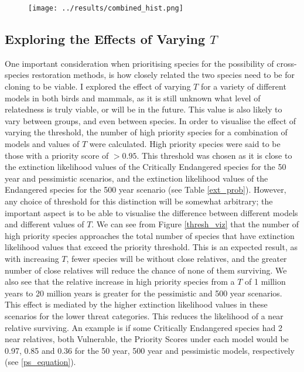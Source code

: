 \documentclass[10pt]{article}
\begin{document}
	\begin{figure}
		\texttt{[image: ../results/combined\_hist.png]}
		\caption{}\label{ps_hist}
	\end{figure}

	\subsection{Exploring the Effects of Varying $T$}
	One important consideration when prioritising species for the possibility of cross-species
	restoration methods, is how closely related the two species need to be for cloning to be viable.
	I explored the effect of varying $T$ for a variety of different models in both birds and mammals,
	as it is still unknown what level of relatedness is truly viable, or will be in the future. This
	value is also likely to vary between groups, and even between species. In order to visualise
	the effect of varying the threshold, the number of high priority species for a combination of
	models and values of $T$ were calculated. High priority species were said to be those with a
	priority score of $>0.95$. This threshold was chosen as it is close to the extinction likelihood
	values of the Critically Endangered species for the 50 year and pessimistic scenarios, and the
	extinction likelihood values of the Endangered species for the 500 year scenario (see Table 
	\ref{ext_prob}). However, any
	choice of threshold for this distinction will be somewhat arbitrary; the important aspect is to 
	be able to visualise the difference between different models and different values of $T$. We can
	see from Figure \ref{thresh_viz} that the number of high priority species approaches the total
	number of species that have extinction likelihood values that exceed the priority threshold.
	This is an expected result, as with increasing $T$, fewer species will be without close relatives,
	and the greater number of close relatives will reduce the chance of none of them surviving. We
	also see that the relative increase in high priority species from a $T$ of 1 million years to 20
	million years is greater for the pessimistic and 500 year scenarios. This effect is mediated by
	the higher extinction likelihood values in these scenarios for the lower threat categories. This
	reduces the likelihood of a near relative surviving. An example is if some Critically Endangered
	species had 2 near relatives, both Vulnerable, the Priority Scores under each model would be 
	0.97, 0.85 and 0.36 for the 50 year, 500 year and pessimistic models, respectively (see 
	\ref{ps_equation}).
	
\end{document}
